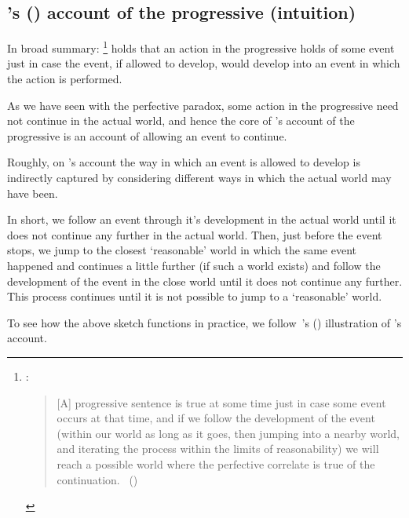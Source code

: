 \subsection[\citeauthor{Landman:1992wh}'s account of the progressive (modified)]{\citeauthor{Landman:1992wh}'s (\citeyear{Landman:1992wh}) account of the progressive (intuition)}
\label{cha:sec:fcs-def:progressive-landman}
\nocite{Portner:1998um}
\nocite{Engelberg:1999vi}

\begin{note}
  In broad summary:%
  \footnote{
    \textcite{Szabo:2004ul}:
  \begin{quote}
    [A] progressive sentence is true at some time just in case some event occurs at that time, and if we follow the development of the event (within our world as long as it goes, then jumping into a nearby world, and iterating the process within the limits of reasonability) we will reach a possible world where the perfective correlate is true of the continuation.%
    \mbox{ }\hfill\mbox{(\citeyear[34]{Szabo:2004ul})}
  \end{quote}
  }
  \citeauthor{Landman:1992wh} holds that an action in the progressive holds of some event just in case the event, if allowed to develop, would develop into an event in which the action is performed.

  As we have seen with the perfective paradox, some action in the progressive need not continue in the actual world, and hence the core of \citeauthor{Landman:1992wh}'s account of the progressive is an account of allowing an event to continue.

  Roughly, on \citeauthor{Landman:1992wh}'s account the way in which an event is allowed to develop is indirectly captured by considering different ways in which the actual world may have been.

  In short, we follow an event through it's development in the actual world until it does not continue any further in the actual world.
  Then, just before the event stops, we jump to the closest `reasonable' world in which the same event happened and continues a little further (if such a world exists) and follow the development of the event in the close world until it does not continue any further.
  This process continues until it is not possible to jump to a `reasonable' world.
\end{note}

\begin{note}
  To see how the above sketch functions in practice, we follow~\citeauthor{Portner:1998um}'s (\citeyear[764--766]{Portner:1998um}) illustration of \citeauthor{Landman:1992wh}'s account.
\end{note}

